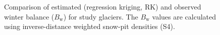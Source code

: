 \documentclass[onecolumn, letterpaper]{igs}
\begin{document}
\begin{figure}
	\caption[Comparison of estimated (regression kriging, RK) and observed winter balance ($B_\mathrm{w}$) for study glaciers]{Comparison of estimated (regression kriging, RK) and observed winter balance ($B_\mathrm{w}$) for study glaciers. The $B_\mathrm{w}$ values are calculated using inverse-distance weighted snow-pit densities (S4).}
	\label{fig:R2regressionkrig}
\end{figure}




\clearpage
%



\end{document}
